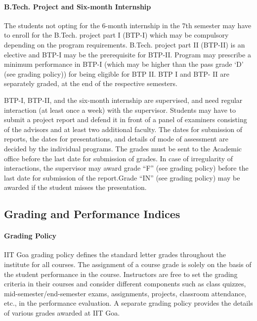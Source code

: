 \paragraph{B.Tech. Project and Six-month Internship} The students not opting for the 6-month internship in the 7th semester may have to enroll for the B.Tech. project part I (BTP-I) which may be compulsory depending on the program requirements. B.Tech. project part II (BTP-II) is an elective and BTP-I may be the prerequisite for BTP-II. Program may prescribe a minimum performance in BTP-I (which may be higher than the pass grade ‘D’ (see grading policy)) for being eligible for BTP II. BTP I and BTP- II are separately graded, at the end of the respective semesters.

BTP-I, BTP-II, and the six-month internship are supervised, and need regular interaction (at least once a week) with the supervisor. Students may have to submit a project report and defend it in front of a panel of examiners consisting of the advisors and at least two additional faculty. The dates for submission of reports, the dates for presentations, and details of mode of assessment are decided by the individual programs. The grades must be sent to the Academic office before the last date for submission of grades. In case of irregularity of interactions, the supervisor may award grade “F” (see grading policy) before the last date for submission of the report.Grade “IN” (see grading policy) may be awarded if the student misses the presentation.

\subsection{Grading and Performance Indices}

\paragraph{Grading Policy} IIT Goa grading policy defines the standard letter grades throughout the institute for all courses. The assignment of a course grade is solely on the basis of the student performance in the course. Instructors are free to set the grading criteria in their courses and consider different components such as class quizzes, mid-semester/end-semester exams, assignments, projects, classroom attendance, etc., in the performance evaluation.  A separate grading policy provides the details of various grades awarded at IIT Goa.

